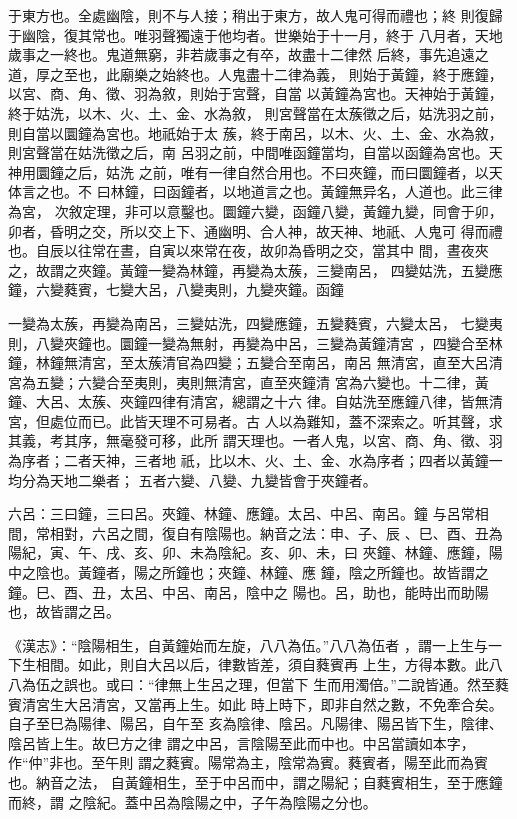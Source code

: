 \documentclass{ctexart}
\begin{document}
于東方也。全處幽陰，則不与人接；稍出于東方，故人鬼可得而禮也；終 則復歸于幽陰，復其常也。唯羽聲獨遠于他均者。世樂始于十一月，終于 八月者，天地歲事之一終也。鬼道無窮，非若歲事之有卒，故盡十二律然 后終，事先追遠之道，厚之至也，此廟樂之始終也。人鬼盡十二律為義， 則始于黃鐘，終于應鐘，以宮、商、角、徵、羽為敘，則始于宮聲，自當 以黃鐘為宮也。天神始于黃鐘，終于姑洗，以木、火、土、金、水為敘， 則宮聲當在太蔟徵之后，姑洗羽之前，則自當以圜鐘為宮也。地祇始于太 蔟，終于南呂，以木、火、土、金、水為敘，則宮聲當在姑洗徵之后，南 呂羽之前，中間唯函鐘當均，自當以函鐘為宮也。天神用圜鐘之后，姑洗 之前，唯有一律自然合用也。不曰夾鐘，而曰圜鐘者，以天体言之也。不 曰林鐘，曰函鐘者，以地道言之也。黃鐘無异名，人道也。此三律為宮， 次敘定理，非可以意鑿也。圜鐘六變，函鐘八變，黃鐘九變，同會于卯， 卯者，昏明之交，所以交上下、通幽明、合人神，故天神、地祇、人鬼可 得而禮也。自辰以往常在晝，自寅以來常在夜，故卯為昏明之交，當其中 間，晝夜夾之，故謂之夾鐘。黃鐘一變為林鐘，再變為太蔟，三變南呂， 四變姑洗，五變應鐘，六變蕤賓，七變大呂，八變夷則，九變夾鐘。函鐘

一變為太蔟，再變為南呂，三變姑洗，四變應鐘，五變蕤賓，六變太呂， 七變夷則，八變夾鐘也。圜鐘一變為無射，再變為中呂，三變為黃鐘清宮 ，四變合至林鐘，林鐘無清宮，至太蔟清官為四變；五變合至南呂，南呂 無清宮，直至大呂清宮為五變；六變合至夷則，夷則無清宮，直至夾鐘清 宮為六變也。十二律，黃鐘、大呂、太蔟、夾鐘四律有清宮，總謂之十六 律。自姑洗至應鐘八律，皆無清宮，但處位而已。此皆天理不可易者。古 人以為難知，蓋不深索之。听其聲，求其義，考其序，無毫發可移，此所 謂天理也。一者人鬼，以宮、商、角、徵、羽為序者；二者天神，三者地 祇，比以木、火、土、金、水為序者；四者以黃鐘一均分為天地二樂者； 五者六變、八變、九變皆會于夾鐘者。

六呂：三曰鐘，三曰呂。夾鐘、林鐘、應鐘。太呂、中呂、南呂。鐘 与呂常相間，常相對，六呂之間，復自有陰陽也。納音之法：申、子、辰 、巳、酉、丑為陽紀，寅、午、戌、亥、卯、未為陰紀。亥、卯、未，曰 夾鐘、林鐘、應鐘，陽中之陰也。黃鐘者，陽之所鐘也；夾鐘、林鐘、應 鐘，陰之所鐘也。故皆謂之鐘。巳、酉、丑，太呂、中呂、南呂，陰中之 陽也。呂，助也，能時出而助陽也，故皆謂之呂。

《漢志》：``陰陽相生，自黃鐘始而左旋，八八為伍。''八八為伍者 ，謂一上生与一下生相間。如此，則自大呂以后，律數皆差，須自蕤賓再 上生，方得本數。此八八為伍之誤也。或曰：``律無上生呂之理，但當下 生而用濁倍。''二說皆通。然至蕤賓清宮生大呂清宮，又當再上生。如此 時上時下，即非自然之數，不免牽合矣。自子至巳為陽律、陽呂，自午至 亥為陰律、陰呂。凡陽律、陽呂皆下生，陰律、陰呂皆上生。故巳方之律 謂之中呂，言陰陽至此而中也。中呂當讀如本字，作``仲''非也。至午則 謂之蕤賓。陽常為主，陰常為賓。蕤賓者，陽至此而為賓也。納音之法， 自黃鐘相生，至于中呂而中，謂之陽紀；自蕤賓相生，至于應鐘而終，謂 之陰紀。蓋中呂為陰陽之中，子午為陰陽之分也。
\end{document}
